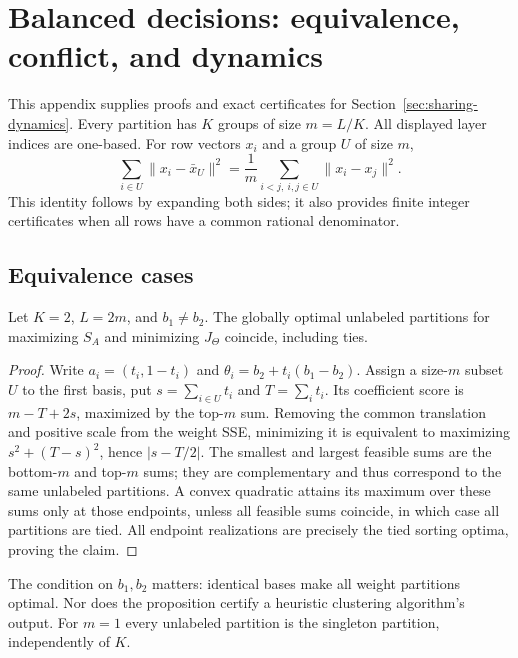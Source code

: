 \section{Balanced decisions: equivalence, conflict, and dynamics}
\label{app:decision-proofs}

This appendix supplies proofs and exact certificates for
Section~\ref{sec:sharing-dynamics}. Every partition has $K$ groups of
size $m=L/K$. All displayed layer indices are one-based. For row vectors
$x_i$ and a group $U$ of size $m$,
\begin{equation}
 \sum_{i\in U}\|x_i-\bar x_U\|^2
 =\frac1m\sum_{i<j,\ i,j\in U}\|x_i-x_j\|^2. \label{eq:pairwise-sse}
\end{equation}
This identity follows by expanding both sides; it also provides finite
integer certificates when all rows have a common rational denominator.

\subsection{Equivalence cases}

\begin{proposition}
\label{prop:two-basis-decisions}
Let $K=2$, $L=2m$, and $b_1\ne b_2$. The globally optimal unlabeled
partitions for maximizing $S_A$ and minimizing $J_\Theta$ coincide,
including ties.
\end{proposition}
\begin{proof}
Write $a_i=(t_i,1-t_i)$ and $\theta_i=b_2+t_i(b_1-b_2)$.
Assign a size-$m$ subset $U$ to the first basis, put $s=\sum_{i\in U}t_i$
and $T=\sum_i t_i$. Its coefficient score is $m-T+2s$, maximized by
the top-$m$ sum. Removing the common translation and positive scale from
the weight SSE, minimizing it is equivalent to maximizing
$s^2+(T-s)^2$, hence $|s-T/2|$. The smallest and largest feasible sums
are the bottom-$m$ and top-$m$ sums; they are complementary and thus
correspond to the same unlabeled partitions. A convex quadratic attains
its maximum over these sums only at those endpoints, unless all feasible
sums coincide, in which case all partitions are tied. All endpoint
realizations are precisely the tied sorting optima, proving the claim.
\end{proof}

The condition on $b_1,b_2$ matters: identical bases make all weight
partitions optimal. Nor does the proposition certify a heuristic clustering
algorithm's output. For $m=1$ every unlabeled partition is the singleton
partition, independently of $K$.


